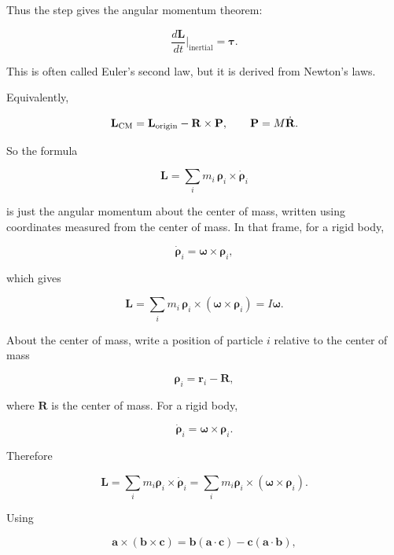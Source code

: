 \documentclass[a4paper,11pt]{article}
\begin{document}
Thus the step gives the angular momentum theorem:

\begin{equation}
\frac{d\mathbf L}{dt}\bigg|_{\text{inertial}}
=
\boldsymbol\tau.
\label{eq:angular_momentum}
\end{equation}

This is often called Euler’s second law, but it is derived from Newton’s laws.



\hrulefill

\hrulefill

Equivalently,

\[
\mathbf L_{\rm CM}
=
\mathbf L_{\rm origin}-\mathbf R\times \mathbf P,
\qquad
\mathbf P=M\dot{\mathbf R}.
\]

So the formula

\[
\mathbf L=\sum_i m_i\,\boldsymbol\rho_i\times\dot{\boldsymbol\rho}_i
\]

is just the angular momentum about the center of mass, written using coordinates
measured from the center of mass. In that frame, for a rigid body,

\[
\dot{\boldsymbol\rho}_i=\boldsymbol\omega\times\boldsymbol\rho_i,
\]

which gives

\[
\mathbf L
=
\sum_i m_i\,\boldsymbol\rho_i\times(\boldsymbol\omega\times\boldsymbol\rho_i)
=
I\boldsymbol\omega.
\]

\hrulefill

About the center of mass, write a position of particle \(i\) relative to
the center of mass

\[
\boldsymbol\rho_i=\mathbf r_i-\mathbf R,
\]

where \(\mathbf R\) is the center of mass. For a rigid body,

\[
\dot{\boldsymbol\rho}_i=\boldsymbol\omega\times\boldsymbol\rho_i.
\]

Therefore

\[
\mathbf L
=
\sum_i m_i \boldsymbol\rho_i\times\dot{\boldsymbol\rho}_i
=
\sum_i m_i \boldsymbol\rho_i\times(\boldsymbol\omega\times\boldsymbol\rho_i).
\]

Using

\[
\mathbf a\times(\mathbf b\times\mathbf c)
=
\mathbf b(\mathbf a\cdot\mathbf c)-\mathbf c(\mathbf a\cdot\mathbf b),
\]
\end{document}

